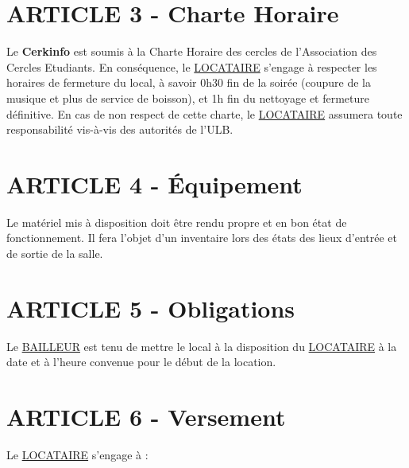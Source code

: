 \documentclass{article}
\begin{document}
\section*{ARTICLE 3 - Charte Horaire}
Le \textbf{Cerkinfo} est soumis à la Charte Horaire des cercles de l'Association des Cercles Etudiants. En conséquence, le \underline{LOCATAIRE} s'engage à respecter les horaires de fermeture du local, à savoir 0h30 fin de la soirée (coupure de la musique et plus de service de boisson), et 1h fin du nettoyage et fermeture définitive. En cas de non respect de cette charte, le \underline{LOCATAIRE} assumera toute responsabilité vis-à-vis des autorités de l'ULB.

\section*{ARTICLE 4 - Équipement}
Le matériel mis à disposition doit être rendu propre et en bon état de fonctionnement. Il fera l’objet d’un inventaire lors des états des lieux d’entrée et de sortie de la salle.

\section*{ARTICLE 5 - Obligations}
Le \underline{BAILLEUR} est tenu de mettre le local à la disposition du \underline{LOCATAIRE} à la date et à l’heure convenue pour le début de la location.


\section*{ARTICLE 6 - Versement}
Le \underline{LOCATAIRE} s’engage à :
\end{document}
